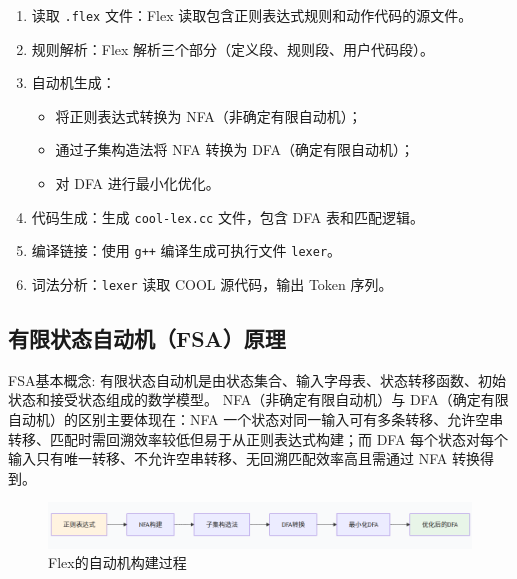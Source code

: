 \documentclass[twocolumn]{article}
\begin{document}
\begin{enumerate}
    \item 读取 \texttt{.flex} 文件：Flex 读取包含正则表达式规则和动作代码的源文件。
    \item 规则解析：Flex 解析三个部分（定义段、规则段、用户代码段）。
    \item 自动机生成：
        \begin{itemize}
            \item 将正则表达式转换为 NFA（非确定有限自动机）；
            \item 通过子集构造法将 NFA 转换为 DFA（确定有限自动机）；
            \item 对 DFA 进行最小化优化。
        \end{itemize}
    \item 代码生成：生成 \texttt{cool-lex.cc} 文件，包含 DFA 表和匹配逻辑。
    \item 编译链接：使用 \texttt{g++} 编译生成可执行文件 \texttt{lexer}。
    \item 词法分析：\texttt{lexer} 读取 COOL 源代码，输出 Token 序列。
\end{enumerate}

\subsection{有限状态自动机（FSA）原理}

FSA基本概念: 有限状态自动机是由状态集合、输入字母表、状态转移函数、初始状态和接受状态组成的数学模型。
NFA（非确定有限自动机）与 DFA（确定有限自动机）的区别主要体现在：NFA 一个状态对同一输入可有多条转移、允许空串转移、匹配时需回溯效率较低但易于从正则表达式构建；而 DFA 每个状态对每个输入只有唯一转移、不允许空串转移、无回溯匹配效率高且需通过 NFA 转换得到。

\begin{figure}[H]
    \centering
    \includegraphics[width=\linewidth]{Flex_auto_create.png}
    \caption{Flex的自动机构建过程}
    \label{fig:flex_workflow}
\end{figure}
\end{document}
